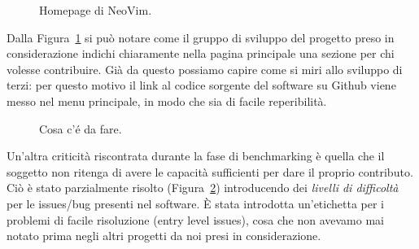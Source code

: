 \documentclass[12pt]{article} %
\begin{document}
\begin{figure}[H]
\caption{Homepage di NeoVim.}
\label{fig:buonesempio1}
\end{figure}

Dalla Figura~\ref{fig:buonesempio1} si pu\`o notare come il gruppo di sviluppo del progetto preso in considerazione indichi chiaramente nella pagina principale una sezione per chi volesse contribuire. Gi\`a da questo possiamo capire come si miri allo sviluppo di terzi: per questo motivo il link al codice sorgente del software su Github viene messo nel menu principale, in modo che sia di facile reperibilit\`a.

\begin{figure}[H]
\caption{Cosa c'\'e da fare.}
\label{fig:buonesempio2}
\end{figure}

Un'altra criticit\`a riscontrata durante la fase di benchmarking \`e quella che il soggetto non ritenga di avere le capacit\`a sufficienti per dare il proprio contributo.\\
Ci\`o \`e stato parzialmente risolto (Figura~\ref{fig:buonesempio2}) introducendo dei \emph{livelli di difficolt\`a} per le issues/bug presenti nel software. \`E stata introdotta un'etichetta per i problemi di facile risoluzione (entry level issues), cosa che non avevamo mai notato prima negli altri progetti da noi presi in considerazione.
\end{document}
